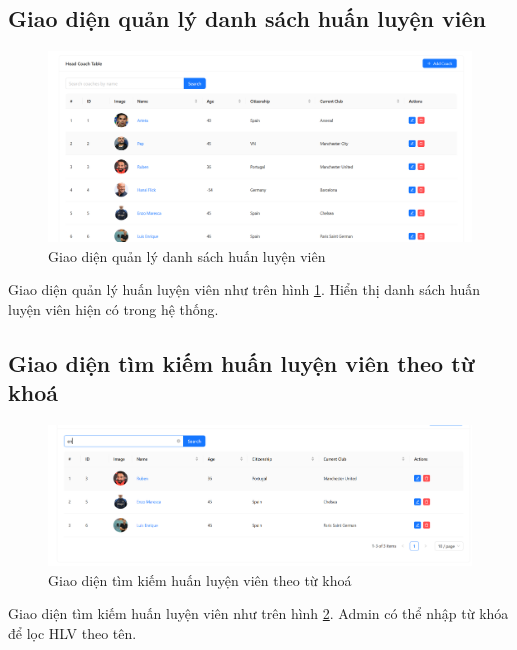\documentclass[../BTL.tex]{subfiles}
\begin{document}
\subsection{Giao diện quản lý danh sách huấn luyện viên}
\begin{figure}
    \centering
    \includegraphics[width=1\linewidth]{Hinhve/admin_coaches.png}
    \caption{Giao diện quản lý danh sách huấn luyện viên}
    \label{fig:admin_coaches}
\end{figure}
Giao diện quản lý huấn luyện viên như trên hình \ref{fig:admin_coaches}. Hiển thị danh sách huấn luyện viên hiện có trong hệ thống.

\subsection{Giao diện tìm kiếm huấn luyện viên theo từ khoá}
\begin{figure}
    \centering
    \includegraphics[width=1\linewidth]{Hinhve/admin_search_coach.png}
    \caption{Giao diện tìm kiếm huấn luyện viên theo từ khoá}
    \label{fig:admin_search_coach}
\end{figure}
Giao diện tìm kiếm huấn luyện viên như trên hình \ref{fig:admin_search_coach}. Admin có thể nhập từ khóa để lọc HLV theo tên.
\end{document}
